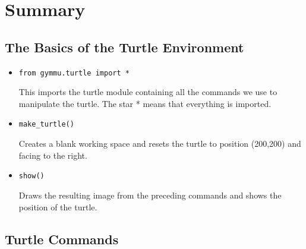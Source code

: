 \documentclass[11pt,a4paper]{report}
\begin{document}
\section{Summary}


\subsection{The Basics of the Turtle Environment}

\begin{itemize}
\item \begin{lstlisting}
from gymmu.turtle import *
\end{lstlisting}

This imports the turtle \gls{module} containing all the commands we use to manipulate the turtle. The star * means that everything is imported.

\item \begin{lstlisting}
make_turtle()
\end{lstlisting}

Creates a blank working space and resets the turtle to position (200,200) and facing to the right.



\item \begin{lstlisting}
show()
\end{lstlisting}

Draws the resulting image from the preceding commands and shows the position of the turtle.

\end{itemize}


\subsection{Turtle Commands}
\end{document}
